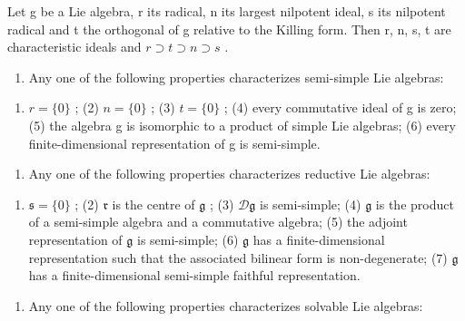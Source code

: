

Let g be a Lie algebra, r its radical, n its largest nilpotent ideal, s its nilpotent radical and t the orthogonal of g relative to the Killing form. Then r, n, s, t are characteristic ideals and \(r \supset t \supset n \supset s\) .

\begin{enumerate}
\def\labelenumi{(\Roman{enumi})}
\tightlist
\item
  Any one of the following properties characterizes semi-simple Lie algebras:
\end{enumerate}

\begin{enumerate}
\def\labelenumi{(\arabic{enumi})}
\tightlist
\item
  \(r = \{0\}\) ; (2) \(n = \{0\}\) ; (3) \(t = \{0\}\) ; (4) every commutative ideal of g is zero; (5) the algebra g is isomorphic to a product of simple Lie algebras; (6) every finite-dimensional representation of g is semi-simple.
\end{enumerate}

\begin{enumerate}
\def\labelenumi{(\Roman{enumi})}
\setcounter{enumi}{1}
\tightlist
\item
  Any one of the following properties characterizes reductive Lie algebras:
\end{enumerate}

\begin{enumerate}
\def\labelenumi{(\arabic{enumi})}
\tightlist
\item
  \(\mathfrak{s} = \{0\}\) ; (2) \(\mathfrak{r}\) is the centre of \(\mathfrak{g}\) ; (3) \(\mathcal{D}\mathfrak{g}\) is semi-simple; (4) \(\mathfrak{g}\) is the product of a semi-simple algebra and a commutative algebra; (5) the adjoint representation of \(\mathfrak{g}\) is semi-simple; (6) \(\mathfrak{g}\) has a finite-dimensional representation such that the associated bilinear form is non-degenerate; (7) \(\mathfrak{g}\) has a finite-dimensional semi-simple faithful representation.
\end{enumerate}

\begin{enumerate}
\def\labelenumi{(\Roman{enumi})}
\setcounter{enumi}{2}
\tightlist
\item
  Any one of the following properties characterizes solvable Lie algebras:
\end{enumerate}

